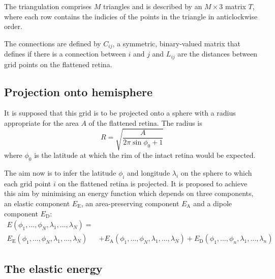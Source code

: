 \documentclass{article}
\begin{document}

The triangulation comprises $M$ triangles and is described by an
$M\times3$ matrix $T$, where each row contains the indicies of the
points in the triangle in anticlockwise order.

The connections are defined by $C_{ij}$, a symmetric, binary-valued
matrix that defines if there is a connection between $i$ and $j$ and
$L_{ij}$ are the distances between grid points on the flattened
retina.

\subsection{Projection onto hemisphere}
\label{fold-sphere:sec:proj-onto-hemisph}

It is supposed that this grid is to be projected onto a sphere with a
radius appropriate for the area $A$ of the flattened retina. The
radius is
\begin{equation}
  \label{fold-sphere:eq:1}
  R = \sqrt{\frac{A}{2\pi\sin\phi_0+1}}
\end{equation}
where $\phi_0$ is the latitude at which the rim of the intact retina
would be expected.

The aim now is to infer the latitude $\phi_i$ and longitude
$\lambda_i$ on the sphere to which each grid point $i$ on the
flattened retina is projected.  It is proposed to achieve this aim by
minimising an energy function which depends on three components, an
elastic component $E_\mathrm{E}$, an area-preserving component
$E_\mathrm{A}$ and a dipole component $E_\mathrm{D}:$
\begin{equation}
  \begin{split}
  E(\phi_1,\dots,\phi_N,\lambda_1,\dots,\lambda_N) = & \\
  E_\mathrm{E}(\phi_1,\dots,\phi_N,\lambda_1,\dots,\lambda_N) 
  & + E_\mathrm{A}(\phi_1,\dots,\phi_N,\lambda_1,\dots,\lambda_N) 
  + E_\mathrm{D}(\phi_1,\dots,\phi_n,\lambda_1,\dots,\lambda_n)
  \end{split}
\end{equation}

\subsection{The elastic energy}
\label{fold-sphere:sec:elastic-force}
\end{document}
